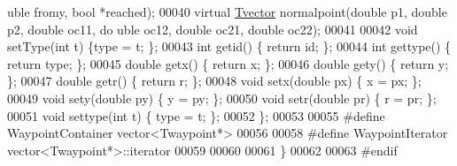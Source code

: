 \begin{DoxyCode}
{      uble} fromy, \textcolor{keywordtype}{bool} *reached);
00040                 \textcolor{keyword}{virtual} \hyperlink{classPed_1_1Tvector}{Tvector} normalpoint(\textcolor{keywordtype}{double} p1, \textcolor{keywordtype}{double} p2, \textcolor{keywordtype}{double} oc11, \textcolor{keywordtype}{do
      uble} oc12, \textcolor{keywordtype}{double} oc21, \textcolor{keywordtype}{double} oc22);
00041 
00042                 \textcolor{keywordtype}{void} setType(\textcolor{keywordtype}{int} t) \{type = t; \};      
00043                 \textcolor{keywordtype}{int} getid() \{ \textcolor{keywordflow}{return} id; \};            
00044                 \textcolor{keywordtype}{int} gettype() \{ \textcolor{keywordflow}{return} type; \};        
00045                 \textcolor{keywordtype}{double} getx() \{ \textcolor{keywordflow}{return} x; \};           
00046                 \textcolor{keywordtype}{double} gety() \{ \textcolor{keywordflow}{return} y; \};           
00047                 \textcolor{keywordtype}{double} getr() \{ \textcolor{keywordflow}{return} r; \};           
00048                 \textcolor{keywordtype}{void} setx(\textcolor{keywordtype}{double} px) \{ x = px; \};      
00049                 \textcolor{keywordtype}{void} sety(\textcolor{keywordtype}{double} py) \{ y = py; \};      
00050                 \textcolor{keywordtype}{void} setr(\textcolor{keywordtype}{double} pr) \{ r = pr; \};      
00051                 \textcolor{keywordtype}{void} settype(\textcolor{keywordtype}{int} t) \{ type = t; \};                                      
00052         \};
00053         
00055 \textcolor{preprocessor}{#define WaypointContainer vector<Twaypoint*>}
00056 \textcolor{preprocessor}{}        
00058 \textcolor{preprocessor}{#define WaypointIterator vector<Twaypoint*>::iterator}
00059 \textcolor{preprocessor}{}        
00060         
00061 \}
00062 
00063 \textcolor{preprocessor}{#endif}
\end{DoxyCode}
